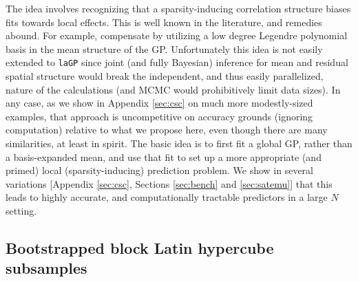 \documentclass[12pt]{article}
\begin{document}
The idea involves recognizing that a sparsity-inducing correlation structure
biases fits towards local effects. This is well known in the literature, and
remedies abound.  For example, \citet{kaufman:etal:2012} compensate by
utilizing a low degree Legendre polynomial basis in the mean structure of the
GP.  Unfortunately this idea is not easily extended to {\tt laGP} since joint
(and fully Bayesian) inference for mean and residual spatial structure would
break the independent, and thus easily parallelized, nature of the
calculations (and MCMC would prohibitively limit data sizes).  In any case, as
we show in Appendix \ref{sec:csc} on much more modestly-sized examples, that
approach is uncompetitive on accuracy grounds (ignoring computation) relative
to what we propose here, even though there are many similarities, at least in
spirit.  The basic idea is to first fit a global GP, rather than a
basis-expanded mean, and use that fit to set up a more appropriate (and
primed) local (sparsity-inducing) prediction problem. We show in several
variations [Appendix \ref{sec:csc}, Sections \ref{sec:bench} and
\ref{sec:satemu}] that this leads to highly accurate, and computationally
tractable predictors in a large $N$ setting.  


\subsection{Bootstrapped block Latin hypercube subsamples}
\label{sec:blhs}
\end{document}
